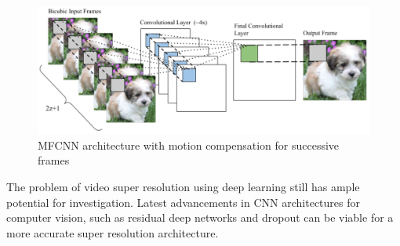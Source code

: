 \documentclass[10pt]{article}
\begin{document}
\begin{figure}[H]
	\centering
	\includegraphics[scale=0.3]{figs/videoCNN.PNG}
	\caption{MFCNN architecture with motion compensation for successive frames}
	\label{fig:2}
\end{figure}

The problem of video super resolution using deep learning still has ample potential for investigation. Latest advancements in CNN architectures for computer vision, such as residual deep networks \cite{he2016deep} and dropout can be viable for a more accurate super resolution architecture. 
\end{document}
